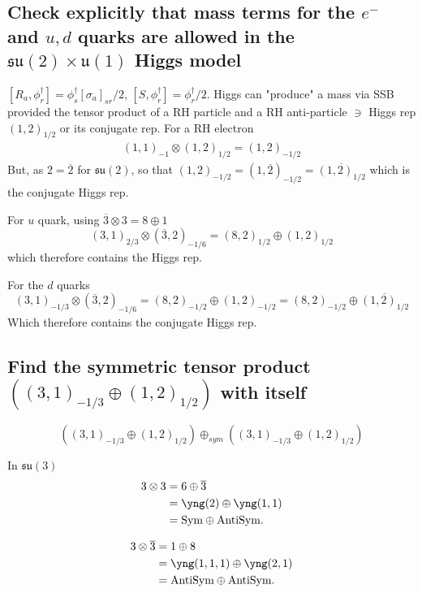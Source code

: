 \documentclass[main.tex]{subfiles}
\begin{document}
\subsection{Check explicitly that mass terms for the $e^-$ and $u,d$ quarks are allowed in the $\mathfrak{su}(2)\times\mathfrak{u}(1)$ Higgs model}
$[R_a,\phi_r^{\dagger}]=\phi_s^{\dagger}[\sigma_a]_{sr}/2$, $[S,\phi_r^{\dagger}]=\phi_r^{\dagger}/2$. Higgs can "produce" a mass via SSB provided the tensor product of a RH particle and a RH anti-particle $\ni$ Higgs rep $(1,2)_{1/2}$ or its conjugate rep. For a RH electron 
\begin{align}
(1,1)_{-1}\otimes(1,2)_{1/2}=(1,2)_{-1/2}
\end{align}
But, as $2=\overline{2}$ for $\mathfrak{su}(2)$, so that $(1,2)_{-1/2}=(1,\overline{2})_{-1/2}=\overline{(1,2)_{1/2}}$ which is the conjugate Higgs rep.

For $u$ quark, using $\overline{3}\otimes3=8\oplus1$
\begin{equation}
(3,1)_{2/3}\otimes(\overline{3},2)_{-1/6}=(8,2)_{1/2}\oplus(1,2)_{1/2}
\end{equation}
which therefore contains the Higgs rep.

For the $d$ quarks
\begin{equation}
(3,1)_{-1/3}\otimes(\overline{3},2)_{-1/6}=(8,2)_{-1/2}\oplus(1,2)_{-1/2}=(8,2)_{-1/2}\oplus\overline{(1,2)_{1/2}}
\end{equation}
Which therefore contains the conjugate Higgs rep.

\subsection{Find the symmetric tensor product $\left((3,1)_{-1/3}\oplus(1,2)_{1/2}\right)$ with itself}

\begin{equation}
\left((3,1)_{-1/3}\oplus(1,2)_{1/2}\right)\oplus_{sym}\left((3,1)_{-1/3}\oplus(1,2)_{1/2}\right)
\end{equation}

In $\mathfrak{su}(3)$
\begin{align}
3\otimes3&=6\oplus\overline{3}\\
&=\yng(2)\oplus\yng(1,1)\\
&=\text{Sym}\oplus\text{AntiSym.}
\end{align}

\begin{align}
3\otimes\overline{3}&=1\oplus8\\
&=\yng(1,1,1)\oplus\yng(2,1)\\
&=\text{AntiSym}\oplus\text{AntiSym.}
\end{align}
\end{document}
